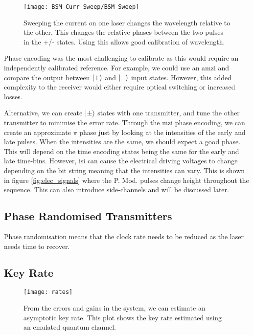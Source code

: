 \begin{figure}[tbp]
	\centering
	\texttt{[image: BSM\_Curr\_Sweep/BSM\_Sweep]}
	\caption[Laser current-error sweep]{Sweeping the current on one laser changes the wavelength relative to the other. This changes the relative phases between the two pulses in the +/- states. Using this allows good calibration of wavelength.}
	\label{fig:wavelength_cal}
\end{figure}

Phase encoding was the most challenging to calibrate as this would require an independently calibrated reference. For example, we could use an \ac{amzi} and compare the output between $\ket{+}$ and $\ket{-}$ input states. However, this added complexity to the receiver would either require optical switching or increased losses. 

Alternative, we can create $\ket{\pm}$ states with one transmitter, and tune the other transmitter to minimise the error rate. Through the \ac{mzi} phase encoding, we can create an approximate $\pi$ phase just by looking at the intensities of the early and late pulses. When the intensities are the same, we should expect a good phase. This will depend on the time encoding states being the same for the early and late time-bins. However, \ac{isi} can cause the electrical driving voltages to change depending on the bit string meaning that the intensities can vary. This is shown in figure \ref{fig:elec_signals} where the P. Mod. pulses change height throughout the sequence. This can also introduce side-channels and will be discussed later.

\subsection{Phase Randomised Transmitters}

Phase randomisation means that the clock rate needs to be reduced as the laser needs time to recover. 

\subsection{Key Rate}

\begin{figure}
	\centering
	\texttt{[image: rates]}
	\caption[Asymptotic key rates of chip-based MDI-QKD]{From the errors and gains in the system, we can estimate an asymptotic key rate. This plot shows the key rate estimated using an emulated quantum channel.}
	\label{fig:mdi_rates}
\end{figure}

